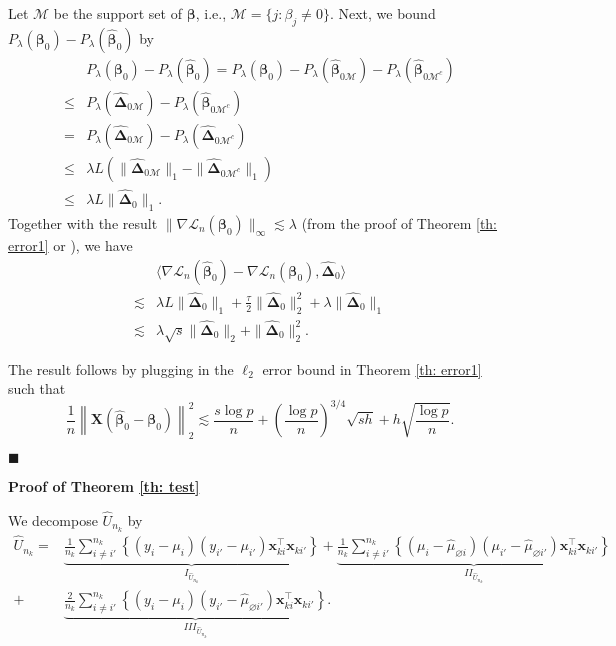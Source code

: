 \documentclass[twoside,12pt]{article}
\newcommand{\mb}[1]{\boldsymbol{\mathbf{#1}}}
\newcommand{\wh}[1]{\widehat{#1}}
\begin{document}
Let $\mathcal M$ be the support set of $\mb\beta$, i.e., $\mathcal M=\{j: \beta_j\neq 0\}$.
Next, we bound $P_{\lambda}(\mb\beta_0)-P_{\lambda}(\wh{\mb\beta}_0)$ by
\begin{equation*}
	\begin{aligned}
		&P_{\lambda}(\mb\beta_0)-P_{\lambda}(\wh{\mb\beta}_0)=P_{\lambda}(\mb\beta_0)-P_{\lambda}(\wh{\mb\beta}_{0\mathcal M})-P_{\lambda}(\wh{\mb\beta}_{0\mathcal M^c})\\
		\leq &P_{\lambda}(\wh{\mb\Delta}_{0\mathcal M})-P_{\lambda}(\wh{\mb\beta}_{0\mathcal M^c})\\
		=&P_{\lambda}(\wh{\mb\Delta}_{0\mathcal M})-P_{\lambda}(\wh{\mb\Delta}_{0\mathcal M^c})\\
		\leq & \lambda L(\|\wh{\mb\Delta}_{0\mathcal M}\|_1-\|\wh{\mb\Delta}_{0\mathcal M^c}\|_1)\\
		\leq & \lambda L\|\wh{\mb\Delta}_{0}\|_1.
	\end{aligned}
\end{equation*}
Together with the result $\|\nabla\mathcal L_n(\mb\beta_0)\|_{\infty}\lesssim\lambda$ (from the proof of Theorem \ref{th: error1} or \citet{Loh2015}), we have
\begin{equation*}
	\begin{aligned}
		&\langle\nabla\mathcal L_n(\wh{\mb\beta}_0)-\nabla\mathcal L_n(\mb\beta_0), \wh{\mb\Delta}_0\rangle\\
		\lesssim& \lambda L \|\wh{\mb\Delta}_{0}\|_1+\frac{\tau}{2}\|\wh{\mb\Delta}_{0}\|_2^2+\lambda \|\wh{\mb\Delta}_{0}\|_1\\
		\lesssim & \lambda\sqrt{s}\|\wh{\mb\Delta}_{0}\|_2+\|\wh{\mb\Delta}_{0}\|_2^2.
	\end{aligned}
\end{equation*}

The result follows by plugging in the $\ell_2$ error bound in Theorem \ref{th: error1} such that
$$\frac1n\left\|\mb X(\wh{\mb\beta}_0-\mb\beta_0)\right\|_2^2\lesssim \frac{s\log p}{n}+\left(\frac{\log p}{n}\right)^{3/4}\sqrt{sh}+h\sqrt{\frac{\log p}{n}}.$$

$\blacksquare$



\textbf{Proof of Theorem \ref{th: test}}

We decompose $\hat{U}_{n_k}$ by
\begin{equation*}
\begin{aligned}
\hat{U}_{n_k}=&\underbrace{\frac{1}{n_k} \sum_{i \neq i'}^{n_k}\left\{\left(y_i-{\mu}_i\right)\left(y_{i'}-{\mu}_{i'}\right) \mb x_{ki}^\top \mb x_{ki'}\right\}}_\text{$I_{\hat U_{n_k}}$}+\underbrace{\frac{1}{n_k} \sum_{i \neq i'}^{n_k}\left\{\left(\mu_i-\hat{\mu}_{\varnothing i}\right)\left(\mu_{i'}-\hat{\mu}_{\varnothing i'}\right) \mb x_{ki}^\top \mb x_{ki'}\right\}}_\text{$II_{\hat U_{n_k}}$}\\
+&\underbrace{\frac{2}{n_k} \sum_{i \neq i'}^{n_k}\left\{\left(y_i-{\mu}_i\right)\left(y_{i'}-\hat{\mu}_{\varnothing i'}\right) \mb x_{ki}^\top \mb x_{ki'}\right\}}_\text{$III_{\hat U_{n_k}}$}.
\end{aligned}
\end{equation*}
\end{document}
